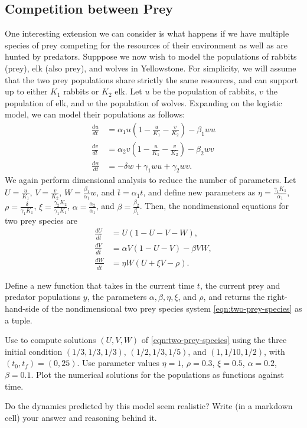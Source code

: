 \subsection*{Competition between Prey}
One interesting extension we can consider is what happens if we have multiple species of prey competing for the resources of their environment as well as are hunted by predators.
Supppose we now wish to model the populations of rabbits (prey), elk (also prey), and wolves in Yellowstone.
For simplicity, we will assume that the two prey populations share strictly the same resources, and can support up to either $K_1$ rabbits or $K_2$ elk.
Let $u$ be the population of rabbits, $v$ the population of elk, and $w$ the population of wolves.
Expanding on the logistic model, we can model their populations as follows:
\begin{align*}
\frac{du}{dt}&=\alpha_1 u\left(1-\frac{u}{K_1}-\frac{v}{K_2}\right)-\beta_1wu
\\
\frac{dv}{dt}&=\alpha_2 v\left(1-\frac{u}{K_1}-\frac{v}{K_2}\right)-\beta_2wv
\\
\frac{dw}{dt}&=-\delta w + \gamma_1 wu + \gamma_2 wv.
\end{align*}
We again perform dimensional analysis to reduce the number of parameters.
Let $U=\frac{u}{K_1}$, $V=\frac{v}{K_2}$, $W=\frac{\beta_1}{\alpha_1}w$, and $\bar t=\alpha_1 t$, and define new parameters as $\eta=\frac{\gamma_1K_1}{\alpha_1}$, $\rho=\frac{\delta}{\gamma_1K_1}$, $\xi=\frac{\gamma_2K_2}{\gamma_1K_1}$, $\alpha=\frac{\alpha_2}{\alpha_1}$, and $\beta=\frac{\beta_2}{\beta_1}$.
Then, the nondimensional equations for two prey species are
\begin{equation}\label{eqn:two-prey-species}
	\begin{split}
	\frac{dU}{d\overline{t}} &= U(1-U-V-W),\\
	\frac{dV}{d\overline{t}} &= \alpha V(1-U-V) - \beta VW,\\
	\frac{dW}{d\overline{t}} &= \eta W(U+\xi V-\rho).
	\end{split}
\end{equation}

\begin{problem}
Define a new function  that takes in the current time $t$, the current prey and predator populations $y$, the parameters $\alpha,\beta,\eta,\xi$, and $\rho$, and returns the right-hand-side of the nondimensional two prey species system \eqref{eqn:two-prey-species} as a tuple.

Use  to compute solutions $(U,V,W)$ of \eqref{eqn:two-prey-species} using the three initial condition $(1/3,1/3,1/3)$, $(1/2,1/3,1/5)$, and $(1,1/10,1/2)$, with $(t_0,t_f)=(0,25)$.
Use parameter values $\eta=1$, $\rho=0.3$, $\xi=0.5$, $\alpha=0.2$, $\beta=0.1$.
Plot the numerical solutions for the populations as functions against time.

Do the dynamics predicted by this model seem realistic?
Write (in a markdown cell) your answer and reasoning behind it.
\end{problem}


